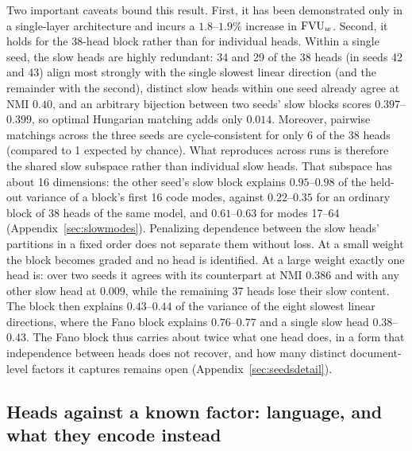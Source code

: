 Two important caveats bound this result. First, it has been demonstrated
only in a single-layer architecture and incurs a $1.8$--$1.9\%$ increase in
$\mathrm{FVU}_w$. Second, it holds for the 38-head block rather than for individual
heads. Within a single seed, the slow heads are
highly redundant: 34 and 29 of the 38 heads (in seeds 42 and 43) align most
strongly with the single slowest linear direction (and the remainder with
the second), distinct slow heads within one seed already agree at NMI
$0.40$, and an arbitrary bijection between two seeds' slow blocks scores
$0.397$--$0.399$, so optimal Hungarian matching adds only $0.014$. Moreover,
pairwise matchings across the three seeds are cycle-consistent for only 6 of
the 38 heads (compared to 1 expected by chance). What reproduces across runs
is therefore the shared slow subspace rather than individual slow heads.
That subspace has about 16 dimensions: the other seed's slow block explains
$0.95$--$0.98$ of the held-out variance of a block's first 16 code modes,
against $0.22$--$0.35$ for an ordinary block of 38 heads of the same model,
and $0.61$--$0.63$ for modes 17--64 (Appendix~\ref{sec:slowmodes}).
Penalizing dependence between the slow heads' partitions in a fixed order
does not separate them without loss. At a small weight the block becomes
graded and no head is identified. At a large weight exactly one head is:
over two seeds it agrees with its counterpart at NMI $0.386$ and with any
other slow head at $0.009$, while the remaining 37 heads lose their slow
content. The block then explains $0.43$--$0.44$ of the variance of the
eight slowest linear directions, where the Fano block explains
$0.76$--$0.77$ and a single slow head $0.38$--$0.43$. The Fano block thus
carries about twice what one head does, in a form that independence
between heads does not recover, and how many distinct document-level
factors it captures remains open (Appendix~\ref{sec:seedsdetail}).

\subsection{Heads against a known factor: language, and what they encode instead}
\label{sec:lang}

